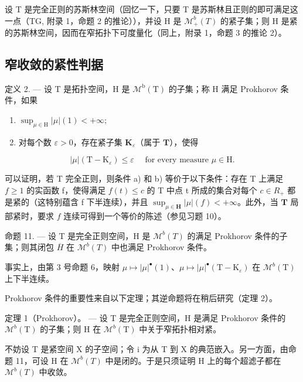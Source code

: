 设 T 是完全正则的苏斯林空间（回忆一下，只要 T 是苏斯林且正则的即可满足这一点（TG, 附录 1，命题 2 的推论）），并设 H 是 \(\mathcal{M}_{+}^{b}(T)\) 的紧子集；则 H 是紧的苏斯林空间，因而在窄拓扑下可度量化（同上，附录 1，命题 3 的推论 2）。

\subsection{窄收敛的紧性判据}

定义 2. --- 设 T 是拓扑空间，H 是 \(\mathcal{M}^{\mathrm{b}}(\mathrm{T})\) 的子集；称 H 满足 Prokhorov 条件，如果

\begin{enumerate}
\def\labelenumi{\alph{enumi})}
\item
  \(\sup_{\mu \in \mathrm{H}}|\mu |(1) < +\infty ;\)
\item
  对每个数 \(\varepsilon > 0\)，存在紧子集 \(\mathbf{K}_{\varepsilon}\)（属于 \(\mathbf{T}\)），使得
\end{enumerate}

\[
| \mu | (\mathrm{T} - \mathrm{K} _ {\varepsilon}) \leqslant \varepsilon \quad \text { for every measure } \mu \in \mathrm{H}.\tag{6}
\]

可以证明，若 T 完全正则，则条件 a) 和 b) 等价于以下条件：存在 T 上满足 \(f \geqslant 1\) 的实函数 f，使得满足 \(f(t) \leqslant c\) 的 T 中点 t 所成的集合对每个 \(c \in R_{+}\) 都是紧的（这特别蕴含 f 下半连续），并且 \(\sup_{\mu \in \mathbf{H}} |\mu|(f) < +\infty\)。此外，当 \(\mathbf{T}\) 局部紧时，要求 \(f\) 连续可得到一个等价的陈述（参见习题 10）。

命题 11. --- 设 T 是完全正则空间，H 是 \(\mathcal{M}^{b}(T)\) 的满足 Prokhorov 条件的子集；则其闭包 \(\overline{H}\) 在 \(\mathcal{M}^{b}(T)\) 中也满足 Prokhorov 条件。

事实上，由第 3 号命题 6，映射 \(\mu \mapsto |\mu|^{\bullet}(1)\)、\(\mu \mapsto |\mu|^{\bullet}(\mathrm{T} - \mathrm{K}_{\varepsilon})\) 在 \(\mathcal{M}^b (\mathrm{T})\) 上下半连续。

Prokhorov 条件的重要性来自以下定理；其逆命题将在稍后研究（定理 2）。

定理 1（Prokhorov）。 --- 设 T 是完全正则空间，H 是满足 Prokhorov 条件的 \(\mathcal{M}^{b}(\mathrm{T})\) 的子集；则 H 在 \(\mathcal{M}^{b}(\mathrm{T})\) 中关于窄拓扑相对紧。

不妨设 T 是紧空间 X 的子空间；令 i 为从 T 到 X 的典范嵌入。另一方面，由命题 11，可设 H 在 \(\mathcal{M}^{b}(T)\) 中是闭的。于是只须证明 H 上的每个超滤子都在 \(\mathcal{M}^{b}(T)\) 中收敛。

